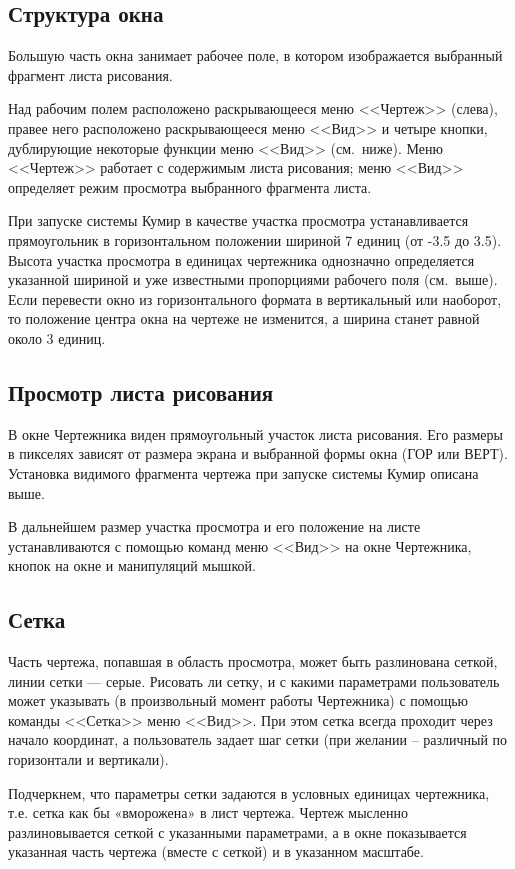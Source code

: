 \documentclass[12pt,a4paper]{article}
\begin{document}
\subsection{Структура окна}
Большую часть окна занимает рабочее поле, в котором изображается выбранный фрагмент листа рисования.

Над рабочим полем расположено раскрывающееся меню <<Чертеж>> (слева), правее него расположено раскрывающееся меню <<Вид>> и четыре кнопки, дублирующие некоторые функции меню <<Вид>> (см.~ниже). Меню <<Чертеж>> работает с содержимым листа рисования; меню <<Вид>> определяет режим просмотра выбранного фрагмента листа.

При запуске системы Кумир в качестве участка просмотра устанавливается  прямоугольник в горизонтальном положении шириной  7 единиц (от -3.5 до 3.5).  Высота участка просмотра в единицах чертежника однозначно определяется указанной шириной и уже известными пропорциями рабочего поля (см.~выше).  Если перевести окно из горизонтального формата в вертикальный или наоборот, то положение центра окна на чертеже не изменится, а ширина станет равной около 3 единиц.

\subsection{Просмотр листа рисования}

	В окне Чертежника виден прямоугольный участок листа рисования. Его размеры в пикселях зависят от размера экрана и выбранной формы окна (ГОР или ВЕРТ).  Установка видимого фрагмента чертежа при запуске системы Кумир описана выше.

В дальнейшем размер участка просмотра и его положение на листе устанавливаются с помощью команд меню <<Вид>> на окне Чертежника, кнопок на окне и манипуляций мышкой.

\subsection{Сетка}
\label{drawsetka}

Часть чертежа, попавшая в область просмотра, может быть разлинована сеткой, линии сетки --- серые. Рисовать ли сетку, и с какими параметрами пользователь может указывать (в произвольный момент работы Чертежника) с помощью команды <<Сетка>> меню <<Вид>>. При этом сетка всегда проходит через начало координат, а пользователь задает шаг сетки (при желании -- различный по горизонтали и вертикали).

Подчеркнем, что параметры сетки задаются в условных единицах чертежника, т.е. сетка как бы «вморожена» в лист чертежа. Чертеж мысленно разлиновывается сеткой с указанными параметрами, а в окне показывается указанная часть чертежа (вместе с сеткой) и в указанном масштабе.
\end{document}
